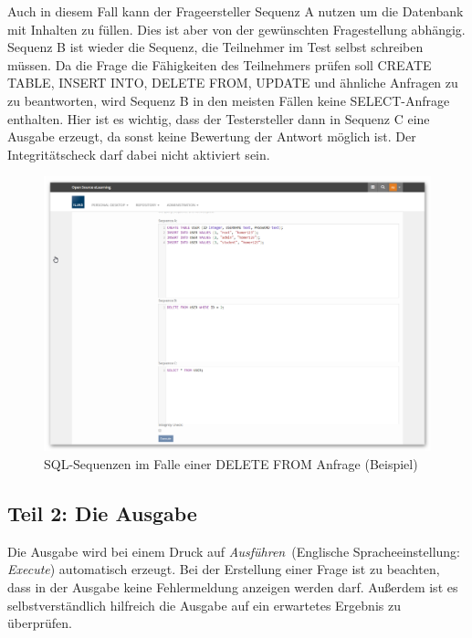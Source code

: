         Auch in diesem Fall kann der Frageersteller Sequenz A nutzen um die Datenbank mit Inhalten zu füllen. Dies ist aber von der gewünschten Fragestellung abhängig. Sequenz B ist wieder die Sequenz, die Teilnehmer im Test selbst schreiben müssen. Da die Frage die Fähigkeiten des Teilnehmers prüfen soll CREATE TABLE, INSERT INTO, DELETE FROM, UPDATE und ähnliche Anfragen zu zu beantworten, wird Sequenz B in den meisten Fällen keine SELECT-Anfrage enthalten. Hier ist es wichtig, dass der Testersteller dann in Sequenz C eine Ausgabe erzeugt, da sonst keine Bewertung der Antwort möglich ist. Der Integritätscheck darf dabei nicht aktiviert sein.
        
        \begin{figure}[H]
            \begin{center}
                \includegraphics[page=1, width=0.7\paperwidth, trim=4 4 4 4, clip]{fig/Beispiel-SQL-Sequenzen-bei-DELETE-FROM-Anfrage.png} 
                \caption{SQL-Sequenzen im Falle einer DELETE FROM Anfrage (Beispiel)}
                \label{fig:beispiel-sql-sequenzen-bei-delete-from-anfrage}
            \end{center}
        \end{figure}
        
\subsection{Teil 2: Die Ausgabe}
            
        Die Ausgabe wird bei einem Druck auf \glqq\textit{Ausführen}\grqq\ (Englische Spracheeinstellung: \glqq\textit{Execute}\grqq ) automatisch erzeugt. Bei der Erstellung einer Frage ist zu beachten, dass in der Ausgabe keine Fehlermeldung anzeigen werden darf. Außerdem ist es selbstverständlich hilfreich die Ausgabe auf ein erwartetes Ergebnis zu überprüfen.
        

